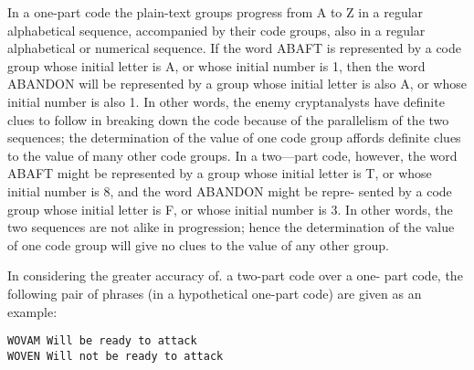 \mypara In a one-part code the plain-text groups progress from A to Z in a
regular alphabetical sequence, accompanied by their code groups, also in
a regular alphabetical or numerical sequence. If the word ABAFT is
represented by a code group whose initial letter is A, or whose initial
number is 1, then the word ABANDON will be represented by a group
whose initial letter is also A, or whose initial number is also 1. In other
words, the enemy cryptanalysts have deﬁnite clues to follow in breaking
down the code because of the parallelism of the two sequences; the
determination of the value of one code group affords deﬁnite clues to the
value of many other code groups. In a two—part code, however, the word
ABAFT might be represented by a group whose initial letter is T, or
whose initial number is 8, and the word ABANDON might be repre-
sented by a code group whose initial letter is F, or whose initial number
is 3. In other words, the two sequences are not alike in progression;
hence the determination of the value of one code group will give no clues
to the value of any other group.

\mypara In considering the greater accuracy of. a two-part code over a one-
part code, the following pair of phrases (in a hypothetical one-part code)
are given as an example:

\begin{verbatim}
WOVAM Will be ready to attack
WOVEN Will not be ready to attack
\end{verbatim}

